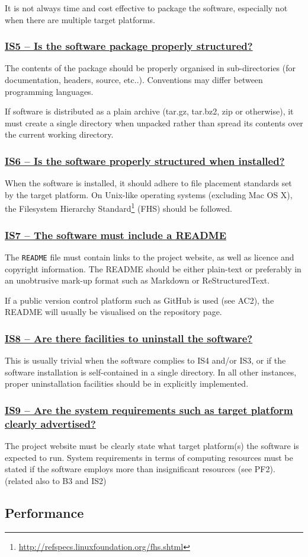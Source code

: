 \documentclass[a4paper,11pt]{article}
\newcommand{\indicator}[1]{\subsubsection*{\underline{#1}}}
\begin{document}
It is not always time and cost effective to package the software, especially not
when there are multiple target platforms. 

\indicator{IS5 -- Is the software package properly structured?}

The contents of the package should be properly organised in sub-directories
(for documentation, headers, source, etc..). Conventions may differ between
programming languages.

If software is distributed as a plain archive (tar.gz, tar.bz2, zip or otherwise),
it must create a single directory when unpacked rather than spread its contents
over the current working directory.

\indicator{IS6 -- Is the software properly structured when installed?}

When the software is installed, it should adhere to file placement standards set
by the target platform. On Unix-like operating systems (excluding Mac OS X), the Filesystem
Hierarchy Standard\footnote{\url{http://refspecs.linuxfoundation.org/fhs.shtml}} (FHS) should be followed.

\indicator{IS7 -- The software must include a README}

The \texttt{README} file must contain links to the project website, as well as
licence and copyright information. The README should be either plain-text or
preferably in an unobtrusive mark-up format such as Markdown or ReStructuredText.

If a public version control platform such as GitHub is used (see AC2), the
README will usually be visualised on the repository page.

\indicator{IS8 -- Are there facilities to uninstall the software?}

This is usually trivial when the software complies to IS4 and/or IS3, or if the
software installation is self-contained in a single directory. In all other
instances, proper uninstallation facilities should be in explicitly implemented.

\indicator{IS9 -- Are the system requirements such as target platform clearly advertised?}

The project website must be clearly state what target platform(s) the software is expected to run.
System requirements in terms of computing resources must be stated if the software employs more than insignificant resources (see PF2).
(related also to B3 and IS2)

\subsection{Performance}
\end{document}
